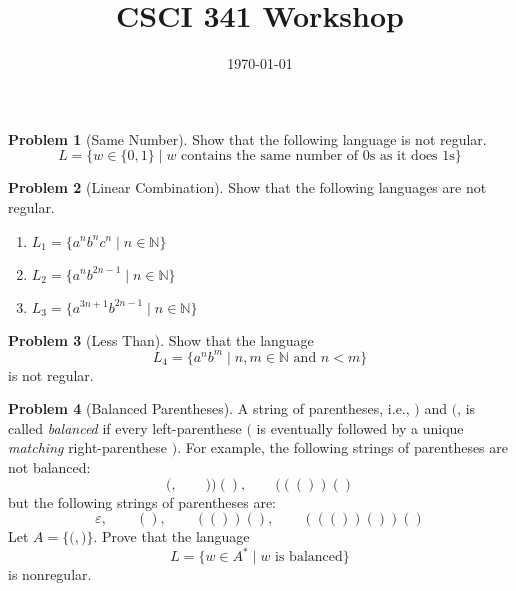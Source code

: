 \documentclass[11pt]{article}
\title{CSCI 341 Workshop \wshop}
\author{\subtitle}
\date{
    \today
}
\theoremstyle{theorem} %
\theoremstyle{definition} %
\newtheorem{problem}                    {{\color{BurntOrange}Problem}}
\theoremstyle{remark} %
\begin{document}
\maketitle



\begin{problem}[Same Number]
    Show that the following language is not regular.
    \[
        L = \{w \in \{0,1\} \mid \text{\(w\) contains the same number of \(0\)s as it does \(1\)s}\}
    \] 
\end{problem}

\vspace{20em}

\begin{problem}[Linear Combination]
    Show that the following languages are not regular. 
    \begin{enumerate}
        \item \(L_1 = \{a^nb^nc^n \mid n \in \mathbb N \}\)
        
        \pagebreak
        
        \item \(L_2 = \{a^nb^{2n - 1} \mid n \in \mathbb N \}\)
        \vspace{25em}
        
        \item \(L_3 = \{a^{3n+1}b^{2n - 1} \mid n \in \mathbb N \}\)
        
        \pagebreak

    \end{enumerate}
\end{problem}

\begin{problem}[Less Than]
    Show that the language
    \[L_4 = \{a^nb^m \mid n,m \in \mathbb N \text{ and } n < m\}\]
    is not regular.
\end{problem}

\vspace{15em}

\begin{problem}[Balanced Parentheses]
    A string of parentheses, i.e., \(\mathtt{)}\) and \(\mathtt{(}\), is called \emph{balanced} if every left-parenthese \(\mathtt{(}\) is eventually followed by a unique \emph{matching} right-parenthese \(\mathtt{)}\). 
    For example, the following strings of parentheses are not balanced:
    \[
        \mathtt{(},
        \qquad \mathtt{))()},
        \qquad \mathtt{((())()}
    \]
    but the following strings of parentheses are:
    \[
        \varepsilon,
        \qquad \mathtt{()},
        \qquad \mathtt{(())()},
        \qquad \mathtt{((())())()}
    \]
    Let \(A = \{\mathtt{(}, \mathtt{)}\}\). 
    Prove that the language 
    \[
        L = \{w \in A^* \mid \text{\(w\) is balanced}\}
    \]
    is nonregular.
\end{problem}
\end{document}

